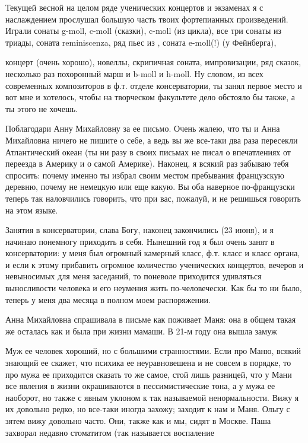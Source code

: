 Текущей весной на целом ряде ученических концертов и экзаменах я с наслаждением
прослушал большую часть твоих фортепианных произведений. Играли сонаты g-moll,
c-moll (сказки), c-moll (из цикла), все три сонаты из триады, соната
reminiscenza, ряд пьес из , соната e-moll(!) (у Фейнберга),


концерт (очень хорошо), новеллы, скрипичная соната, импровизации, ряд сказок,
несколько раз похоронный марш и  b-moll и h-moll. Ну словом, из всех
современных композиторов в ф.т. отделе консерватории, ты занял первое место и
вот мне и хотелось, чтобы на творческом факультете дело обстояло бы также, а ты
этого не хочешь.

Поблагодари Анну Михайловну за ее письмо. Очень жалею, что ты и Анна Михайловна
ничего не пишите о себе, а ведь вы же все-таки два раза пересекли Атлантический
океан (ты ни разу в своих письмах не писал о впечатлениях от переезда в Америку
и о самой Америке). Наконец, я всякий раз забываю тебя спросить: почему именно
ты избрал своим местом пребывания французскую деревню, почему не немецкую или
еще какую. Вы оба наверное по-французски теперь так наловчились говорить, что
при вас, пожалуй, и не решишься говорить на этом языке.


Занятия в консерватории, слава Богу, наконец закончились (23 июня), и я начинаю
понемногу приходить в себя. Нынешний год я был очень занят в консерватории: у
меня был огромный камерный класс, ф.т. класс и класс органа, и если к этому
прибавить огромное количество ученических концертов, вечеров и невыносимых для
меня заседаний, то поневоле приходится удивляться выносливости человека и его
неумения жить по-человечески. Как бы то ни было, теперь у меня два месяца в
полном моем распоряжении.

Анна Михайловна спрашивала в письме как поживает Маня: она в общем такая же
осталась как и была при жизни мамаши. В 21-м году она вышла замуж


Муж ее человек хороший, но с большими странностями. Если про Маню, всякий
знающий ее скажет, что психика ее неуравновешена и не совсем в порядке, то про
мужа ее приходится сказать то же самое, стой лишь разницей, что у Мани все
явления в жизни окрашиваются в пессимистические тона, а у мужа ее наоборот, но
также с явным уклоном к так называемой ненормальности. Вижу я их довольно
редко, но все-таки иногда захожу; заходит к нам и Маня. Ольгу с зятем вижу
довольно часто. Они, также как и мы, сидят в Москве. Паша захворал недавно
стоматитом (так называется воспаление


